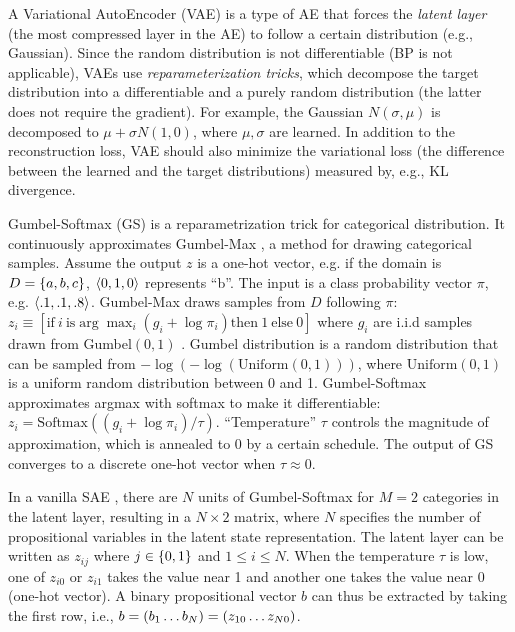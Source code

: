 A Variational AutoEncoder (VAE) \cite{kingma2013auto} is a type of AE that forces the \emph{latent layer} (the most compressed layer in the AE) to follow a certain distribution (e.g., Gaussian).
Since the random distribution is not differentiable (BP is not applicable), VAEs use \emph{reparameterization tricks}, which decompose the target distribution into a differentiable and a purely random distribution (the latter does not require the gradient).
For example, the Gaussian $N(\sigma,\mu)$ is decomposed to $\mu+\sigma N(1,0)$, where $\mu,\sigma$ are learned.
In addition to the reconstruction loss, VAE should also minimize the variational loss (the difference between the learned and the target distributions) measured by, e.g.,  KL divergence.

Gumbel-Softmax (GS) is a reparametrization trick \cite{jang2016categorical} for categorical distribution.
It continuously approximates Gumbel-Max \cite{maddison2014sampling}, a method for drawing categorical samples.
Assume the output $z$ is a one-hot vector, e.g. if the domain is $D={\left\{a,b,c\right\}}$, ${\left<0,1,0\right>}$ represents ``b''.
The input is a class probability vector $\pi$, e.g. ${\left<.1,.1,.8\right>}$.
Gumbel-Max draws samples from $D$ following $\pi$:
 $z_i \equiv [ \text{if}\ i\ \text{is} \arg \max_i (g_i+\log \pi_i) \text{then}\ 1\ \text{else}\ 0 ]$
where $g_i$ are i.i.d samples drawn from Gumbel$(0,1)$ \cite{gumbel1954statistical}.
Gumbel distribution is a random distribution that can be sampled from $-\log (-\log (\text{Uniform}(0,1)))$, where
$\text{Uniform}(0,1)$ is a uniform random distribution between 0 and 1.
Gumbel-Softmax approximates argmax with softmax to make it differentiable:
$z_i = \text{Softmax}((g_i+\log \pi_i)/\tau)$.
``Temperature'' $\tau$ controls the magnitude of approximation, which is annealed to 0 by a certain schedule.
The output of GS converges to a discrete one-hot vector when $\tau\approx 0$.

In a vanilla SAE \cite{Asai2018}, there are $N$ units of Gumbel-Softmax
for $M=2$ categories in the latent layer, resulting in a $N\times 2$ matrix,
where $N$ specifies the number of propositional variables in the latent
state representation. The latent layer can be written as
$z_{ij}$ where $j\in {\left\{0,1\right\}}$ and $1\leq i \leq N$.  When the
temperature $\tau$ is low, one of $z_{i0}$ or $z_{i1}$ takes the value
near 1 and another one takes the value near 0 (one-hot vector).  A binary
propositional vector $b$ can thus be extracted by taking the first row, i.e.,
$b={\left(b_1\ldots b_N\right)}={\left(z_{10}\ldots z_{N0}\right)}$.

